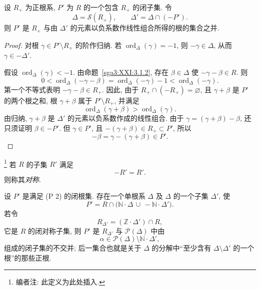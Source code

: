 \begin{proposition}\label{sga3:XXI:3.3.10}
设 \(R_+\) 为正根系, \(P'\) 为 \(R\) 的一个包含 \(R_+\) 的闭子集. 令
\[
 \Delta=\mathscr{S}(R_+),
 \qquad
 \Delta'=\Delta\cap(-P').
\]
则 \(P'\) 是 \(R_+\) 与由 \(\Delta'\) 的元素以负系数作线性组合所得的根的集合之并.
\end{proposition}
\begin{proof}
对根 \(\gamma\in P'\setminus R_+\) 的阶作归纳. 若 \(\operatorname{ord}_\Delta(\gamma)=-1\), 则 \(-\gamma\in\Delta\), 从而 \(\gamma\in-\Delta'\).

假设 \(\operatorname{ord}_\Delta(\gamma)<-1\). 由命题~\ref{sga3:XXI:3.1.2}, 存在 \(\beta\in\Delta\) 使 \(-\gamma-\beta\in R\). 则
\[
 0<\operatorname{ord}_\Delta(-\gamma-\beta)
  =\operatorname{ord}_\Delta(-\gamma)-1
  <\operatorname{ord}_\Delta(-\gamma).
\]
第一个不等式表明 \(-\gamma-\beta\in R_+\). 因此, 由于 \(R_+\cap(-R_+)=\varnothing\), 且 \(\gamma+\beta\) 是 \(P'\) 的两个根之和, 根 \(\gamma+\beta\) 属于 \(P'\setminus R_+\), 并满足
\[
 \operatorname{ord}_\Delta(\gamma+\beta)
 >\operatorname{ord}_\Delta(\gamma).
\]
由归纳, \(\gamma+\beta\) 是 \(\Delta'\) 的元素以负系数作成的线性组合. 由于 \(\gamma=(\gamma+\beta)-\beta\), 还只须证明 \(\beta\in-P'\). 但 \(\gamma\in P'\), 且 \(-(\gamma+\beta)\in R_+\subset P'\), 所以
\[
 -\beta=\gamma-(\gamma+\beta)\in P'.
\]
\end{proof}

\begingroup
\renewcommand{\thetheorem}{3.3.10.1}
\begin{definition}\label{sga3:XXI:3.3.10.1}
\footnote{编者注: 此定义为此处插入.}
若 \(R\) 的子集 \(R'\) 满足
\[
 -R'=R'.
\]
则称其\emph{对称}.
\end{definition}
\endgroup
\addtocounter{theorem}{-1}

\begin{scholium}\label{sga3:XXI:3.3.11}
设 \(P'\) 是满足 (P 2) 的闭根集. 存在一个单根系 \(\Delta\) 及 \(\Delta\) 的一个子集 \(\Delta'\), 使
\[
 P'=R\cap\bigl(\mathbb{N}\cdot\Delta
          \,\cup\, -\mathbb{N}\cdot\Delta'\bigr).
\]
若令
\[
 R_{\Delta'}=(\mathbb{Z}\cdot\Delta')\cap R,
\]
它是 \(R\) 的闭对称子集, 则 \(P'\) 是 \(R_{\Delta'}\) 与 \(\mathscr{P}(\Delta)\) 中由
\[
 \alpha\in\mathscr{P}(\Delta)\setminus
           \mathbb{N}\cdot\Delta',
\]
组成的闭子集的不交并; 后一集合也就是关于 \(\Delta\) 的分解中“至少含有 \(\Delta\setminus\Delta'\) 的一个根”的那些正根.
\end{scholium}

